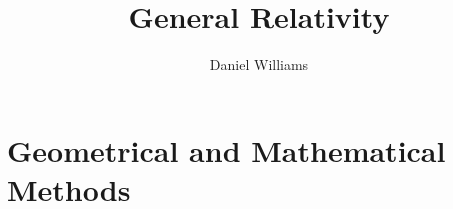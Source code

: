 \documentclass{momento}
\title{General Relativity}
\author{Daniel Williams}
\begin{document}
\frontmatter










\maketitle

\tableofcontents


\mainmatter
\part{Geometrical and Mathematical Methods}
\label{part:geometrical-methods}
\end{document}
